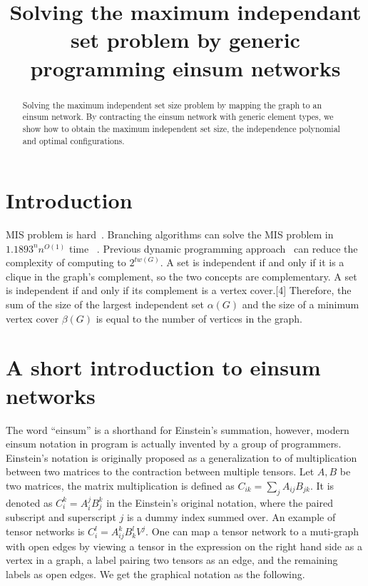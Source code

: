 \documentclass{article}
\newcommand{\<}{\langle}
\renewcommand{\>}{\rangle}
\renewcommand{\cite}[1]{{\citep{#1}}}
\theoremstyle{definition}\newtheorem{definition}{\textit{Definition}}
\begin{document}
\title{Solving the maximum independant set problem by generic programming einsum networks}

\maketitle

\begin{abstract}
	Solving the maximum independent set size problem by mapping the graph to an einsum network. 
    By contracting the einsum network with generic element types, we show how to obtain the maximum independent set size,
    the independence polynomial and optimal configurations.
\end{abstract}

\section{Introduction}
MIS problem is hard~\cite{Hastad1996}.
Branching algorithms can solve the MIS problem in $1.1893^n n ^{O(1)}$ time ~\cite{Xiao2017}.
Previous dynamic programming approach~\cite{Fomin2013} can reduce the complexity of computing to $2^{tw(G)}$.
A set is independent if and only if it is a clique in the graph's complement, so the two concepts are complementary.
A set is independent if and only if its complement is a vertex cover.[4] Therefore, the sum of the size of the largest independent set $\alpha (G)$ and the size of a minimum vertex cover $\beta (G)$ is equal to the number of vertices in the graph.

\section{A short introduction to einsum networks}

The word ``einsum'' is a shorthand for Einstein's summation, however, modern einsum notation in program is actually invented by a group of programmers.
Einstein's notation is originally proposed as a generalization to of multiplication between two matrices to the contraction between multiple tensors.
Let $A, B$ be two matrices, the matrix multiplication is defined as $C_{ik} = \sum_{j}A_{ij}B_{jk}$.
It is denoted as $C_i^k = A_i^j B_j^k$ in the Einstein's original notation, where the paired subscript and superscript $j$ is a dummy index summed over.
An example of tensor networks is $C_i^l = A_{ij}^k B^l_k V^j$.
One can map a tensor network to a muti-graph with open edges by viewing a tensor in the expression on the right hand side as a vertex in a graph, a label pairing two tensors as an edge, and the remaining labels as open edges.
We get the graphical notation as the following.
\end{document}
